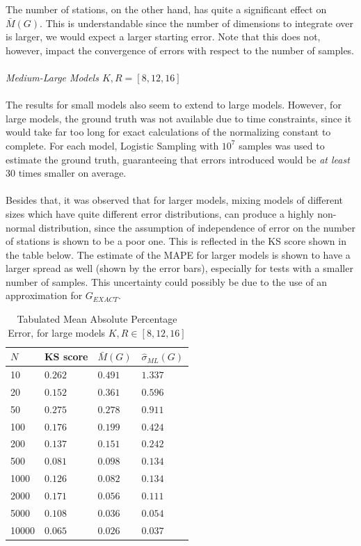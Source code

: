 The number of stations, on the other hand, has quite a significant effect on \(\bar{M}(G)\). This is understandable since the number of dimensions to integrate over is larger, we would expect a larger starting error. Note that this does not, however, impact the convergence of errors with respect to the number of samples.
\\\\
\textit{{\large Medium-Large Models \(K,R = [8,12,16]\)}}
\\\\
The results for small models also seem to extend to large models. However, for large models, the ground truth was not available due to time constraints, since it would take far too long for exact calculations of the normalizing constant to complete. For each model, Logistic Sampling with \(10^7\) samples was used to estimate the ground truth, guaranteeing that errors introduced would be \textit{at least} \(30\) times smaller on average.
\\\\
Besides that, it was observed that for larger models, mixing models of different sizes which have quite different error distributions, can produce a highly non-normal distribution, since the assumption of independence of error on the number of stations is shown to be a poor one. This is reflected in the KS score shown in the table below. The estimate of the MAPE for larger models is shown to have a larger spread as well (shown by the error bars), especially for tests with a smaller number of samples. This uncertainty could possibly be due to the use of an approximation for \(G_{EXACT}\).

\begin{table}[H] 
\begin{center}
\begin{tabular}{@{}llll@{}}
\toprule
    \(N\) & KS score & \(\bar{M}(G)\)  & \(\hat{\sigma}_{ML}(G)\) \\  \midrule
    10 &\(0.262\) & \(0.491\) & \(1.337\) \\ 
    20 &\(0.152\) & \(0.361\) & \(0.596\)  \\ 
    50 &\(0.275\) & \(0.278\) & \(0.911\)  \\ 
    100 &\(0.176\) & \(0.199\) & \(0.424\)  \\ 
    200 &\(0.137\) & \(0.151\) & \(0.242\)  \\ 
    500 &\(0.081\) & \(0.098\) & \(0.134\) \\ 
    1000 &\(0.126\) & \(0.082\) & \(0.134\) \\ 
    2000 &\(0.171\) & \(0.056\) & \(0.111\) \\ 
    5000 &\(0.108\) & \(0.036\) & \(0.054\) \\ 
    10000 &\(0.065\) & \(0.026\) & \(0.037\)  \\     \bottomrule
\end{tabular}
\end{center}
\caption{Tabulated Mean Absolute Percentage Error, for large models \(K,R \in [8, 12, 16]\)}
\label{tab:convergence_tabulated_errors_LM}
\end{table} 

